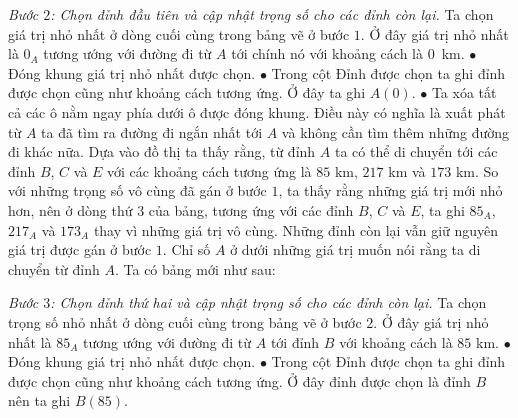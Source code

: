 \begin{multicols}{2}
\begin{table}[H]
	\end{table}
	\textit{Bước $2$: Chọn đỉnh đầu tiên và cập nhật trọng số cho các đỉnh còn lại.}   
	Ta chọn giá trị nhỏ nhất ở dòng cuối cùng trong bảng vẽ ở bước $1$. Ở đây giá trị nhỏ nhất là $0_A$ tương ướng với đường đi từ $A$ tới chính nó với khoảng cách là $0$~km.
	\vskip 0.1cm
	$\bullet$ Đóng khung giá trị nhỏ nhất được chọn. 
	\vskip 0.1cm
	$\bullet$ Trong cột Đỉnh được chọn ta ghi đỉnh được chọn cũng như khoảng cách tương ứng. Ở đây ta ghi $A(0)$.
	\vskip 0.1cm
	$\bullet$ Ta xóa tất cả các ô nằm ngay phía dưới ô được đóng khung. Điều này có nghĩa là xuất phát từ $A$ ta đã tìm ra đường đi ngắn nhất tới $A$ và không cần tìm thêm những đường đi khác nữa.
	\vskip 0.1cm 
	Dựa vào đồ thị ta thấy rằng, từ đỉnh $A$ ta có thể di chuyển tới các đỉnh $B$, $C$ và $E$ với các khoảng cách tương ứng là $85$ km, $217$ km và $173$ km. So với những trọng số vô cùng đã gán ở bước $1$, ta thấy rằng những giá trị mới nhỏ hơn, nên ở dòng thứ $3$ của bảng, tương ứng với các đỉnh $B$, $C$ và $E$, ta ghi $85_A$, $217_A$ và $173_A$ thay vì những giá trị vô cùng. Những đỉnh còn lại vẫn giữ nguyên giá trị được gán ở bước $1$. Chỉ số $A$ ở dưới những giá trị muốn nói rằng ta di chuyển từ đỉnh $A$.
	\vskip 0.1cm 
	Ta có bảng mới như sau: 
	\begin{table}[H]
		\vspace*{-5pt}
		\centering
		\captionsetup{labelformat= empty, justification=centering}
		\vspace*{-10pt}
	\end{table}
	\textit{Bước $3$: Chọn đỉnh thứ hai và cập nhật trọng số cho các đỉnh còn lại.}  Ta chọn trọng số nhỏ nhất ở dòng cuối cùng trong bảng vẽ ở bước $2$. Ở đây giá trị nhỏ nhất là $85_A$ tương ướng với đường đi từ $A$ tới đỉnh $B$ với khoảng cách là  $85$ km.
	\vskip 0.1cm
	$\bullet$ Đóng khung giá trị nhỏ nhất được chọn. 
	\vskip 0.1cm
	$\bullet$ Trong cột Đỉnh được chọn ta ghi đỉnh được chọn cũng như khoảng cách tương ứng. Ở đây đỉnh được chọn là đỉnh $B$ nên ta ghi $B(85)$.

\end{multicols}
